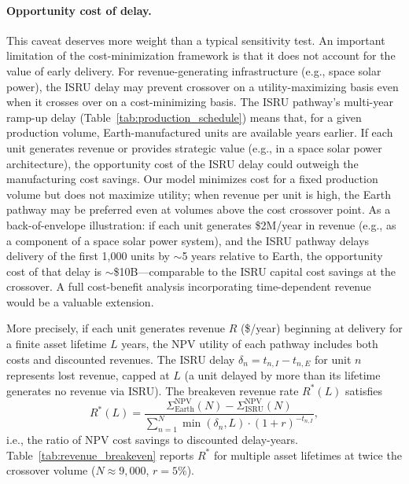 \documentclass[preprint,12pt]{elsarticle}
\begin{document}
\paragraph{Opportunity cost of delay.} This caveat deserves more weight than a typical sensitivity test. An important limitation of the cost-minimization framework is that it does not account for the value of early delivery. For revenue-generating infrastructure (e.g., space solar power), the ISRU delay may prevent crossover on a utility-maximizing basis even when it crosses over on a cost-minimizing basis. The ISRU pathway's multi-year ramp-up delay (Table~\ref{tab:production_schedule}) means that, for a given production volume, Earth-manufactured units are available years earlier. If each unit generates revenue or provides strategic value (e.g., in a space solar power architecture), the opportunity cost of the ISRU delay could outweigh the manufacturing cost savings. Our model minimizes cost for a fixed production volume but does not maximize utility; when revenue per unit is high, the Earth pathway may be preferred even at volumes above the cost crossover point. As a back-of-envelope illustration: if each unit generates \$2M/year in revenue (e.g., as a component of a space solar power system), and the ISRU pathway delays delivery of the first 1{,}000 units by $\sim$5 years relative to Earth, the opportunity cost of that delay is $\sim$\$10B---comparable to the ISRU capital cost savings at the crossover. A full cost-benefit analysis incorporating time-dependent revenue would be a valuable extension.

More precisely, if each unit generates revenue $R$ (\$/year) beginning at delivery for a finite asset lifetime $L$ years, the NPV utility of each pathway includes both costs and discounted revenues. The ISRU delay $\delta_n = t_{n,I} - t_{n,E}$ for unit $n$ represents lost revenue, capped at $L$ (a unit delayed by more than its lifetime generates no revenue via ISRU). The breakeven revenue rate $R^*(L)$ satisfies
\begin{equation}
  R^*(L) = \frac{\Sigma_{\mathrm{Earth}}^{\mathrm{NPV}}(N) - \Sigma_{\mathrm{ISRU}}^{\mathrm{NPV}}(N)}{\sum_{n=1}^{N} \min(\delta_n, L) \cdot (1+r)^{-t_{n,I}}},
  \label{eq:revenue_breakeven}
\end{equation}
i.e., the ratio of NPV cost savings to discounted delay-years. Table~\ref{tab:revenue_breakeven} reports $R^*$ for multiple asset lifetimes at twice the crossover volume ($N \approx 9{,}000$, $r = 5\%$).
\end{document}
